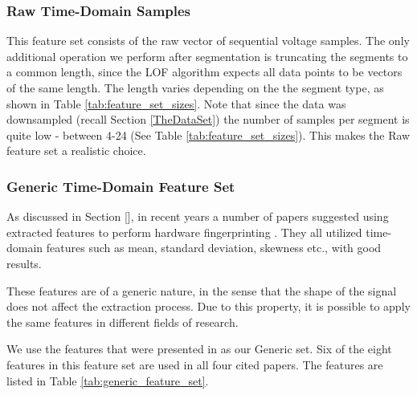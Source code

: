 \documentclass[conference]{IEEEtran}
\begin{document}
\subsubsection{Raw Time-Domain Samples}

  This feature set consists of the raw vector of sequential voltage samples. The only additional operation we perform after segmentation is truncating the segments to a common length, since the LOF algorithm expects all data points to be vectors of the same length. The length varies depending on the the segment type, as shown in Table \ref{tab:feature_set_sizes}. Note that since the data was downsampled (recall Section \ref{TheDataSet}) the number of samples per segment is quite low - between 4-24 (See Table \ref{tab:feature_set_sizes}). This makes the Raw feature set a realistic choice.
  
\subsubsection{Generic Time-Domain Feature Set}
  As discussed in Section [], in recent years a number of papers suggested using extracted features to perform hardware fingerprinting \cite{dey2014accelprint, choi2018identifying, choi2018voltageids kneib2018scission}. They all utilized time-domain features such as mean, standard deviation, skewness etc., with good results.
  
  These features are of a generic nature, in the sense that the shape of the signal does not affect the extraction process. Due to this property, it is possible to apply the same features in different fields of research.
  
  We use the features that were presented in \cite{kneib2018scission} as our Generic set. Six of the eight features in this feature set are used in all four cited papers. The features are listed in Table \ref{tab:generic_feature_set}.
  
\end{document}
